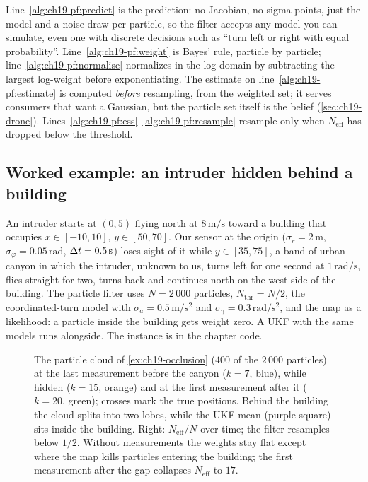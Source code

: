 Line~\ref{alg:ch19-pf:predict} is the prediction: no Jacobian, no sigma
points, just the model and a noise draw per particle, so the filter accepts
any model you can simulate, even one with discrete decisions such as ``turn
left or right with equal probability''. Line~\ref{alg:ch19-pf:weight} is
Bayes' rule, particle by particle; line~\ref{alg:ch19-pf:normalise}
normalizes in the log domain by subtracting the largest log-weight before
exponentiating. The estimate on line~\ref{alg:ch19-pf:estimate} is computed
\emph{before} resampling, from the weighted set; it serves consumers that
want a Gaussian, but the particle set itself is the belief
(\cref{sec:ch19-drone}). Lines~\ref{alg:ch19-pf:ess}--\ref{alg:ch19-pf:resample}
resample only when $N_{\mathrm{eff}}$ has dropped below the
threshold.

\subsection{Worked example: an intruder hidden behind a building}
\label{sec:ch19-pf-example}

\begin{example}
\label{ex:ch19-occlusion}
An intruder starts at $(0, 5)$ flying north at $8\,\mathrm{m/s}$ toward a
building that occupies $x \in [-10, 10]$, $y \in [50, 70]$. Our sensor at
the origin ($\sigma_r = 2\,\mathrm{m}$, $\sigma_\varphi = 0.05\,\mathrm{rad}$,
$\Delta t = 0.5\,\mathrm{s}$) loses sight of it while $y \in [35, 75]$, a band
of urban canyon in which the intruder, unknown to us, turns left for one
second at $1\,\mathrm{rad/s}$, flies straight for two, turns back and
continues north on the west side of the building. The particle filter uses
$N = 2\,000$ particles, $N_{\mathrm{thr}} = N/2$, the coordinated-turn model
with $\sigma_a = 0.5\,\mathrm{m/s^2}$ and $\sigma_\gamma =
0.3\,\mathrm{rad/s^2}$, and the map as a likelihood: a particle inside the
building gets weight zero. A UKF with the same models runs alongside. The
instance is  in the chapter code.
\end{example}

\begin{figure}[tb]
  \centering
  \caption{The particle cloud of \cref{ex:ch19-occlusion} ($400$ of the
  $2\,000$ particles) at the last measurement before the canyon ($k = 7$,
  blue), while hidden ($k = 15$, orange) and at the first measurement after
  it ($k = 20$, green); crosses mark the true positions. Behind the building
  the cloud splits into two lobes, while the UKF mean (purple square) sits
  inside the building. Right: $N_{\mathrm{eff}}/N$ over time; the filter
  resamples below $1/2$. Without measurements the weights stay flat except
  where the map kills particles entering the building; the first measurement
  after the gap collapses $N_{\mathrm{eff}}$ to $17$.}
  \label{fig:ch19-particles}
\end{figure}

